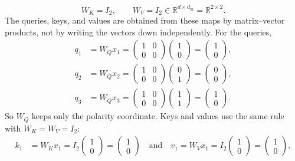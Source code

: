\documentclass[11pt,a4paper]{article}
\theoremstyle{definition}
\begin{document}
\begin{example}
\[W_K=I_2,\qquad
W_V=I_2
\in\mathbb{R}^{d\times d_{\mathrm{in}}}=\mathbb{R}^{2\times 2}.
\]
The queries, keys, and values are obtained from these maps by matrix--vector products, not by writing the vectors down independently. For the queries,
\begin{align*}
q_1
&=W_Q x_1
=\begin{pmatrix}1&0\\0&0\end{pmatrix}
\begin{pmatrix}1\\0\end{pmatrix}
=\begin{pmatrix}1\\0\end{pmatrix},
\\
q_2
&=W_Q x_2
=\begin{pmatrix}1&0\\0&0\end{pmatrix}
\begin{pmatrix}0\\1\end{pmatrix}
=\begin{pmatrix}0\\0\end{pmatrix},
\\
q_3
&=W_Q x_3
=\begin{pmatrix}1&0\\0&0\end{pmatrix}
\begin{pmatrix}1\\1\end{pmatrix}
=\begin{pmatrix}1\\0\end{pmatrix}.
\end{align*}
So \(W_Q\) keeps only the polarity coordinate. Keys and values use the same rule with \(W_K=W_V=I_2\):
\begin{align*}
k_1
&=W_K x_1
=I_2\begin{pmatrix}1\\0\end{pmatrix}
=\begin{pmatrix}1\\0\end{pmatrix}
\quad\text{and}\quad
v_1
=W_V x_1
=I_2\begin{pmatrix}1\\0\end{pmatrix}
=\begin{pmatrix}1\\0\end{pmatrix},

\end{align*}
\end{example}
\end{document}
